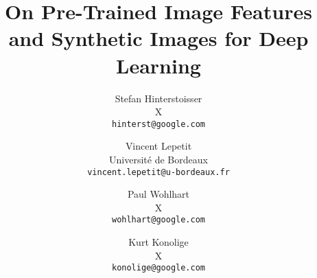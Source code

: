 \documentclass[10pt,twocolumn,letterpaper]{article}
\begin{document}
\title{On Pre-Trained Image Features and Synthetic Images for Deep Learning}

\author{Stefan Hinterstoisser\\
X\\
{\tt\small hinterst@google.com}
\and
Vincent Lepetit\\
Universit\'e de Bordeaux\\
{\tt\small vincent.lepetit@u-bordeaux.fr}
\and
Paul Wohlhart\\
X\\
{\tt\small wohlhart@google.com}
\and
Kurt Konolige\\
X\\
{\tt\small konolige@google.com}
}

\maketitle
\end{document}
